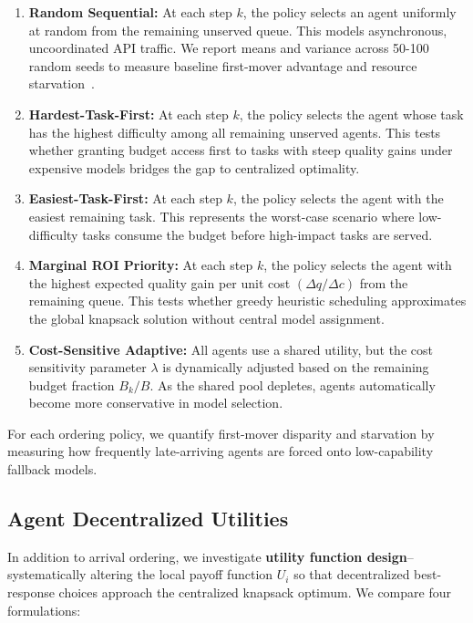 \documentclass{article}
\begin{document}
\begin{enumerate}[leftmargin=*]
    \item \textbf{Random Sequential:} At each step $k$, the policy selects an agent uniformly at random from the remaining unserved queue. This models asynchronous, uncoordinated API traffic. We report means and variance across 50-100 random seeds to measure baseline first-mover advantage and resource starvation~\cite{nisan2007algorithmic}.
    \item \textbf{Hardest-Task-First:} At each step $k$, the policy selects the agent whose task has the highest difficulty among all remaining unserved agents. This tests whether granting budget access first to tasks with steep quality gains under expensive models bridges the gap to centralized optimality.
    \item \textbf{Easiest-Task-First:} At each step $k$, the policy selects the agent with the easiest remaining task. This represents the worst-case scenario where low-difficulty tasks consume the budget before high-impact tasks are served.
    \item \textbf{Marginal ROI Priority:} At each step $k$, the policy selects the agent with the highest expected quality gain per unit cost $(\Delta q / \Delta c)$ from the remaining queue. This tests whether greedy heuristic scheduling approximates the global knapsack solution without central model assignment.
    \item \textbf{Cost-Sensitive Adaptive:} All agents use a shared utility, but the cost sensitivity parameter $\lambda$ is dynamically adjusted based on the remaining budget fraction $B_k / B$. As the shared pool depletes, agents automatically become more conservative in model selection.
\end{enumerate}

For each ordering policy, we quantify first-mover disparity and starvation by measuring how frequently late-arriving agents are forced onto low-capability fallback models.

\subsection{Agent Decentralized Utilities}
\label{sec:utilities}

In addition to arrival ordering, we investigate \textbf{utility function design}--systematically altering the local payoff function $U_i$ so that decentralized best-response choices approach the centralized knapsack optimum. We compare four formulations:
\end{document}
